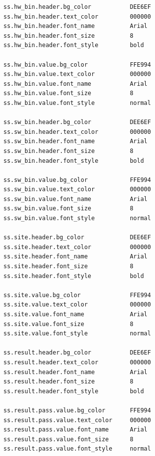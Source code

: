 \documentclass[letterpaper]{article}
\begin{document}
\begin{verbatim}
ss.hw_bin.header.bg_color           DEE6EF
ss.hw_bin.header.text_color         000000
ss.hw_bin.header.font_name          Arial
ss.hw_bin.header.font_size          8
ss.hw_bin.header.font_style         bold

ss.hw_bin.value.bg_color            FFE994
ss.hw_bin.value.text_color          000000
ss.hw_bin.value.font_name           Arial
ss.hw_bin.value.font_size           8
ss.hw_bin.value.font_style          normal

ss.sw_bin.header.bg_color           DEE6EF
ss.sw_bin.header.text_color         000000
ss.sw_bin.header.font_name          Arial
ss.sw_bin.header.font_size          8
ss.sw_bin.header.font_style         bold

ss.sw_bin.value.bg_color            FFE994
ss.sw_bin.value.text_color          000000
ss.sw_bin.value.font_name           Arial
ss.sw_bin.value.font_size           8
ss.sw_bin.value.font_style          normal

ss.site.header.bg_color             DEE6EF
ss.site.header.text_color           000000
ss.site.header.font_name            Arial
ss.site.header.font_size            8
ss.site.header.font_style           bold

ss.site.value.bg_color              FFE994
ss.site.value.text_color            000000
ss.site.value.font_name             Arial
ss.site.value.font_size             8
ss.site.value.font_style            normal

ss.result.header.bg_color           DEE6EF
ss.result.header.text_color         000000
ss.result.header.font_name          Arial
ss.result.header.font_size          8
ss.result.header.font_style         bold

ss.result.pass.value.bg_color       FFE994
ss.result.pass.value.text_color     000000
ss.result.pass.value.font_name      Arial
ss.result.pass.value.font_size      8
ss.result.pass.value.font_style     normal
\end{verbatim}
\clearpage
\end{document}
